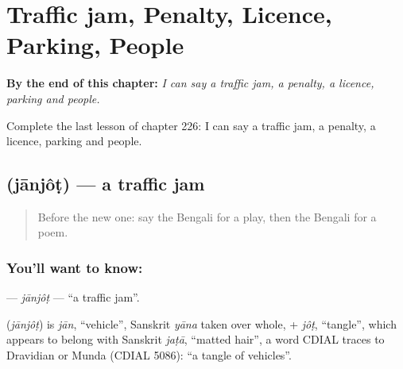 
\chapter{Traffic jam, Penalty, Licence, Parking, People}
\label{ch:bn-traffic-jam-penalty-licence-parking-people}

\begin{chapteropening}
\textbf{By the end of this chapter:} \emph{I can say a traffic jam, a penalty, a licence, parking and people.}

Complete the last lesson of chapter 226: I can say a traffic jam, a penalty, a licence, parking and people.
\end{chapteropening}

\section[\texorpdfstring{\bn{যানজট} (jānjôṭ)}{যানজট (jānjôṭ)}]{ (jānjôṭ) — a traffic jam}

\label{lesson:BN-C226-janjot}



\begin{quote}
Before the new one: say the Bengali for a play, then the Bengali for a poem.
\end{quote}

\subsection*{You'll want to know: }
\textbf{} — \emph{jānjôṭ} — \textquotedblleft{}a traffic jam\textquotedblright{}.

\begin{cousinweb}
\textbf{} (\emph{jānjôṭ}) is \emph{jān}, \textquotedblleft{}vehicle\textquotedblright{}, Sanskrit \emph{yāna} taken over whole, + \emph{jôṭ}, \textquotedblleft{}tangle\textquotedblright{}, which appears to belong with Sanskrit \emph{jaṭā}, \textquotedblleft{}matted hair\textquotedblright{}, a word CDIAL traces to Dravidian or Munda (CDIAL 5086): \textquotedblleft{}a tangle of vehicles\textquotedblright{}.
\end{cousinweb}

